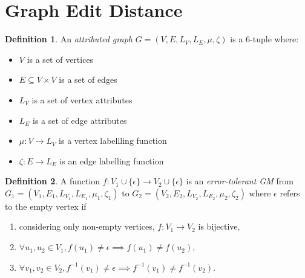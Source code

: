 \documentclass{article}
\theoremstyle{definition}
\newtheorem{definition}{Definition}[section]
\begin{document}
\section{Graph Edit Distance}
\begin{definition}
  An \emph{attributed graph} $G = (V, E, L_V, L_E, \mu, \zeta)$ is a 6-tuple where:
  \begin{itemize}
  \item $V$ is a set of vertices
  \item $E \subseteq V \times V$ is a set of edges
  \item $L_V$ is a set of vertex attributes
  \item $L_E$ is a set of edge attributes
  \item $\mu : V \to L_V$ is a vertex labellling function
  \item $\zeta : E \to L_E$ is an edge labelling function
  \end{itemize}
\end{definition}
\begin{definition}
  A function $f: V_1 \cup \{ \epsilon \} \to V_2 \cup \{ \epsilon \}$ is an \emph{error-tolerant GM} from $G_1 = (V_1, E_1, L_{V_1}, L_{E_1}, \mu_1, \zeta_1)$ to $G_2 = (V_2, E_2, L_{V_2}, L_{E_2}, \mu_2, \zeta_2)$ where $\epsilon$ refers to the empty vertex if
  \begin{enumerate}
  \item considering only non-empty vertices, $f: V_1 \to V_2$ is bijective,
  \item $\forall u_1, u_2 \in V_1, f(u_1) \ne \epsilon \implies f(u_1) \ne f(u_2)$,
  \item $\forall v_1, v_2 \in V_2, f^{-1}(v_1) \ne \epsilon \implies f^{-1}(v_1) \ne f^{-1}(v_2)$.
  \end{enumerate}
\end{definition}
\end{document}
